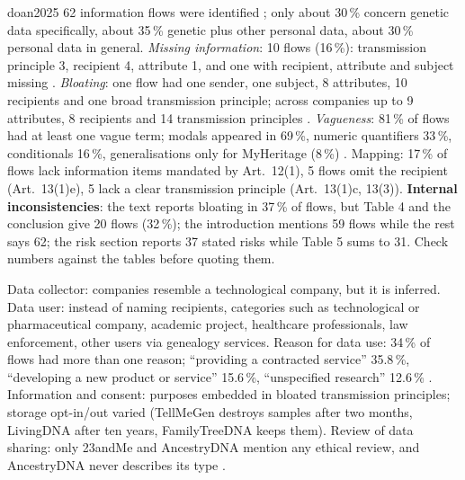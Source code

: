\begin{papercard}{doan2025}
 62 information flows were identified ; only about 30\,\% concern genetic data specifically, about 35\,\% genetic plus other personal data, about 30\,\% personal data in general. \emph{Missing information}: 10 flows (16\,\%): transmission principle 3, recipient 4, attribute 1, and one with recipient, attribute and subject missing . \emph{Bloating}: one flow had one sender, one subject, 8 attributes, 10 recipients and one broad transmission principle; across companies up to 9 attributes, 8 recipients and 14 transmission principles . \emph{Vagueness}: 81\,\% of flows had at least one vague term; modals appeared in 69\,\%, numeric quantifiers 33\,\%, conditionals 16\,\%, generalisations only for MyHeritage (8\,\%) . Mapping: 17\,\% of flows lack information items mandated by Art.\ 12(1), 5 flows omit the recipient (Art.\ 13(1)e), 5 lack a clear transmission principle (Art.\ 13(1)c, 13(3)). \textbf{Internal inconsistencies}: the text reports bloating in 37\,\% of flows, but Table 4 and the conclusion give 20 flows (32\,\%); the introduction mentions 59 flows while the rest says 62; the risk section reports 37 stated risks while Table 5 sums to 31. Check numbers against the tables before quoting them.

 Data collector: companies resemble a technological company, but it is inferred. Data user: instead of naming recipients, categories such as technological or pharmaceutical company, academic project, healthcare professionals, law enforcement, other users via genealogy services. Reason for data use: 34\,\% of flows had more than one reason; ``providing a contracted service'' 35.8\,\%, ``developing a new product or service'' 15.6\,\%, ``unspecified research'' 12.6\,\% . Information and consent: purposes embedded in bloated transmission principles; storage opt-in/out varied (TellMeGen destroys samples after two months, LivingDNA after ten years, FamilyTreeDNA keeps them). Review of data sharing: only 23andMe and AncestryDNA mention any ethical review, and AncestryDNA never describes its type .


\end{papercard}
